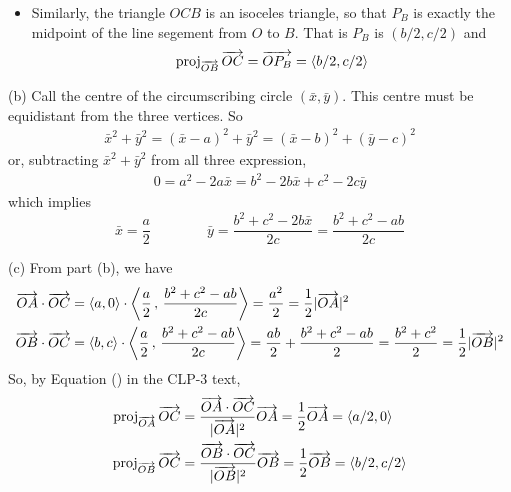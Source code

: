 \begin{solution}
\begin{itemize}
\begin{equation*}
\text{proj}_{\overrightarrow{\scriptstyle OA}}\,\overrightarrow{OC}
    =\overrightarrow{OP_A}=\llt a/2,0\rgt
\end{equation*}
\item 
Similarly, the triangle $OCB$ is an isoceles triangle, so that $P_B$ is 
exactly the midpoint of the line segement from $O$ to $B$. That is $P_B$ is $(b/2,c/2)$ and
\begin{equation*}
\text{proj}_{\overrightarrow{\scriptstyle OB}}\,\overrightarrow{OC}
    =\overrightarrow{OP_B}=\left< b/2,c/2\right>
\end{equation*}
\end{itemize}

(b)
Call the centre of the circumscribing circle $(\bar x,\bar y)$. 
This centre must be equidistant from the three vertices.
So
\begin{align*}
\bar x^2+\bar y^2=(\bar x-a)^2+\bar y^2=(\bar x-b)^2+(\bar y-c)^2 
\end{align*}
or, subtracting $\bar x^2+\bar y^2$ from all three expression,
\begin{align*}
0=a^2-2a\bar x=b^2-2b\bar x+c^2-2c\bar y
\end{align*}
which implies
\begin{equation*}
\bar x=\frac{a}{2}\qquad\qquad \bar y
=\frac{b^2+c^2-2b\bar x}{2c}=\frac{b^2+c^2-ab}{2c}
\end{equation*}


(c) From part (b), we have
\begin{align*}
\overrightarrow{OA}\cdot\overrightarrow{OC}
&=\left< a,0\right>\cdot\left<\frac{a}{2}\,,\,\frac{b^2+c^2-ab}{2c}\right>
=\frac{a^2}{2}=\frac{1}{2}|\overrightarrow{OA}|^2\\
\overrightarrow{OB}\cdot\overrightarrow{OC}
&=\left< b,c\right>\cdot\left<\frac{a}{2}\,,\,\frac{b^2+c^2-ab}{2c}\right>
=\frac{ab}{2}+\frac{b^2+c^2-ab}{2}=\frac{b^2+c^2}{2}
=\frac{1}{2}|\overrightarrow{OB}|^2 
\end{align*}
So, by Equation () in the CLP-3 text,
\begin{align*}
\text{proj}_{\overrightarrow{\scriptstyle OA}}\,\overrightarrow{OC}
&=\frac{\overrightarrow{OA}\cdot\overrightarrow{OC}}{|\overrightarrow{OA}|^2}
           \overrightarrow{OA}
=\frac{1}{2}\overrightarrow{OA}
=\left< a/2,0\right> \\
\text{proj}_{\overrightarrow{\scriptstyle OB}}\,\overrightarrow{OC}
&=\frac{\overrightarrow{OB}\cdot\overrightarrow{OC}}{|\overrightarrow{OB}|^2}
           \overrightarrow{OB}
=\frac{1}{2}\overrightarrow{OB}
=\left< b/2,c/2\right>
\end{align*}


\end{solution}






